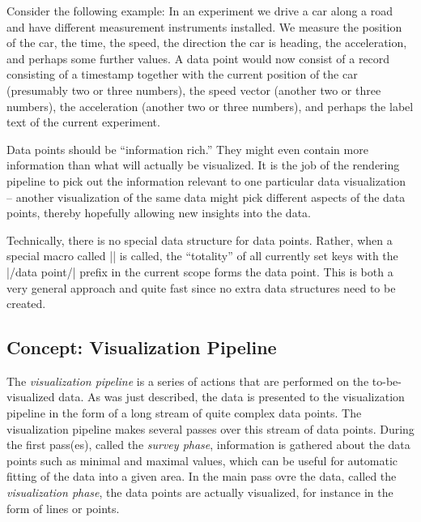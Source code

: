 Consider the following example: In an experiment we drive a car along
a road and have different measurement instruments installed. We
measure the position of the car, the time, the speed, the direction
the car is heading, the acceleration, and perhaps some further
values. A data point would now consist of a record consisting of a
timestamp together with the current position of the car (presumably
two or three numbers), the speed vector (another two or three
numbers), the acceleration (another two or three numbers), and perhaps
the label text of the current experiment. 

Data points should be ``information rich.'' They might even contain
more information than what will actually be visualized. It is the job
of the rendering pipeline to pick out the information relevant to one
particular data visualization -- another visualization of the same
data might pick different aspects of the data points, thereby
hopefully allowing new insights into the data.

Technically, there is no special data structure for data
points. Rather, when a special macro called |\pgfdatapoint| is called,
the ``totality'' of all currently set keys with the |/data point/|
prefix in the current scope forms the data point. This is both a very
general approach and quite fast since no extra data structures need to
be created. 


\subsection{Concept: Visualization Pipeline}

The \emph{visualization pipeline} is a series of actions that are
performed on the to-be-visualized data. As was just described, the
data is presented to the visualization pipeline in the form of a long
stream of quite complex data points. The visualization pipeline makes
several passes over this stream of data points. During the first
pass(es), called the \emph{survey phase}, information is gathered
about the data points such as minimal and maximal values, which can be
useful for automatic fitting of the data into a given area. In the
main pass ovre the data, called the \emph{visualization phase}, the
data points are actually visualized, for instance in the form of lines
or points. 

